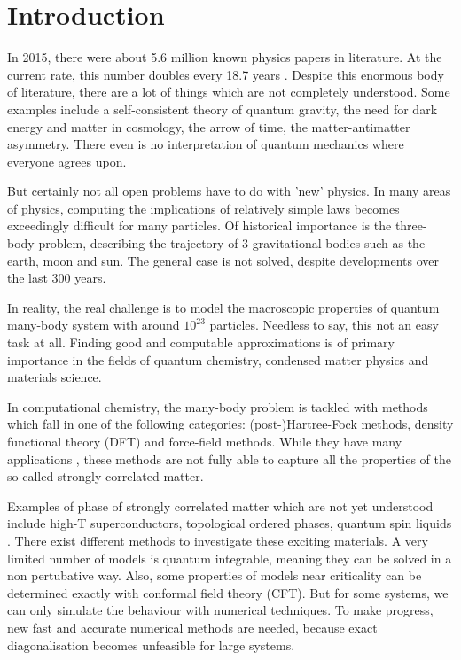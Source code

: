 
\section{Introduction}

In 2015, there were about 5.6 million known physics papers in literature. At the current rate, this number doubles every 18.7 years \cite{Sinatra2015}. Despite this enormous body of literature, there are a lot of things which are not completely understood. Some examples include a self-consistent theory of quantum gravity, the need for dark energy and matter in cosmology, the arrow of time, the matter-antimatter asymmetry. There even is no interpretation of quantum mechanics where everyone agrees upon.

But certainly not all open problems have to do with 'new' physics. In many areas of physics, computing the implications of relatively simple laws becomes exceedingly difficult for many particles. Of historical importance is the three-body problem, describing the trajectory of 3 gravitational bodies such as the earth, moon and sun. The general case is not solved, despite developments over the last 300 years.

In reality, the real challenge is to model the macroscopic properties of quantum many-body system with around $10^{23}$ particles. Needless to say, this not an easy task at all. Finding good and computable approximations is of primary importance in the fields of quantum chemistry, condensed matter physics and materials science.

In computational chemistry, the many-body problem is tackled with methods which fall in one of the following categories: (post-)Hartree-Fock methods, density functional theory (DFT) and force-field methods. While they have many applications , these methods are not fully able to capture all the properties of the so-called strongly correlated matter.

Examples of phase of strongly correlated matter which are not yet understood include high-T superconductors, topological ordered phases, quantum spin liquids \cite{Orus2014}. There exist different methods to investigate these exciting materials. A very limited number of models is quantum integrable, meaning they can be solved in a non pertubative way. Also, some properties of models near criticality can be determined exactly with conformal field theory (CFT). But for some systems, we can only simulate the behaviour with numerical techniques. To make progress, new fast and accurate numerical methods are needed, because exact diagonalisation becomes unfeasible for large systems.

